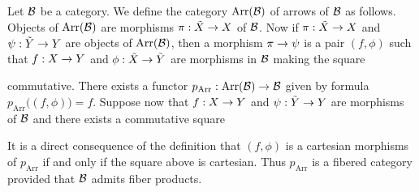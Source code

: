 \begin{example}\label{example:the_fibered_category_of_arrows}
Let ${\mathcal B}$ be a category. We define the category $\mathrm{Arr}({\mathcal B})$ of arrows of ${\mathcal B}$ as follows. Objects of $\mathrm{Arr}({\mathcal B})$ are morphisms $\pi:\tilde{X}\rightarrow X$ of ${\mathcal B}$. Now if $\pi:\tilde{X}\rightarrow X$ and $\psi:\tilde{Y}\rightarrow Y$ are objects of $\mathrm{Arr}({\mathcal B})$, then a morphism $\pi\rightarrow \psi$ is a pair $(f,\phi)$ such that $f:X\rightarrow Y$ and $\phi:\tilde{X}\rightarrow \tilde{Y}$ are morphisms in ${\mathcal B}$ making the square
\begin{center}
\end{center}
commutative. There exists a functor $p_{\mathrm{Arr}}:\mathrm{Arr}({\mathcal B})\rightarrow {\mathcal B}$ given by formula $p_{\mathrm{Arr}}\big((f,\phi)\big) = f$. Suppose now that $f:X\rightarrow Y$ and $\psi:\tilde{Y}\rightarrow Y$ are morphisms of ${\mathcal B}$ and there exists a commutative square
\begin{center}
\end{center}
It is a direct consequence of the definition that $(f,\phi)$ is a cartesian morphisms of $p_{\mathrm{Arr}}$ if and only if the square above is cartesian. Thus $p_{\mathrm{Arr}}$ is a fibered category provided that ${\mathcal B}$ admits fiber products.
\end{example}

